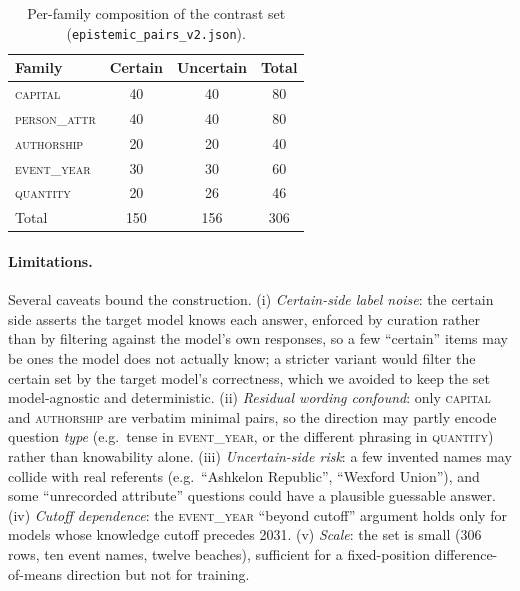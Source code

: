 \begin{table}[t]
\centering
\small
\begin{tabular}{@{}lccc@{}}
\toprule
Family & Certain & Uncertain & Total \\
\midrule
\textsc{capital}      & 40 & 40 & 80 \\
\textsc{person\_attr} & 40 & 40 & 80 \\
\textsc{authorship}   & 20 & 20 & 40 \\
\textsc{event\_year}  & 30 & 30 & 60 \\
\textsc{quantity}     & 20 & 26 & 46 \\
\midrule
Total & 150 & 156 & 306 \\
\bottomrule
\end{tabular}
\caption{Per-family composition of the contrast set (\texttt{epistemic\_pairs\_v2.json}).}
\label{tab:epi-stats}
\end{table}

\paragraph{Limitations.}
Several caveats bound the construction. (i) \emph{Certain-side label noise}: the certain
side asserts the target model knows each answer, enforced by curation rather than by
filtering against the model's own responses, so a few ``certain'' items may be ones the
model does not actually know; a stricter variant would filter the certain set by the target
model's correctness, which we avoided to keep the set model-agnostic and deterministic.
(ii) \emph{Residual wording confound}: only \textsc{capital} and \textsc{authorship} are
verbatim minimal pairs, so the direction may partly encode question \emph{type}
(e.g.\ tense in \textsc{event\_year}, or the different phrasing in \textsc{quantity}) rather
than knowability alone. (iii) \emph{Uncertain-side risk}: a few invented names may collide
with real referents (e.g.\ ``Ashkelon Republic'', ``Wexford Union''), and some ``unrecorded
attribute'' questions could have a plausible guessable answer. (iv) \emph{Cutoff
dependence}: the \textsc{event\_year} ``beyond cutoff'' argument holds only for models whose
knowledge cutoff precedes 2031. (v) \emph{Scale}: the set is small ($306$ rows, ten event
names, twelve beaches), sufficient for a fixed-position difference-of-means direction but
not for training.
